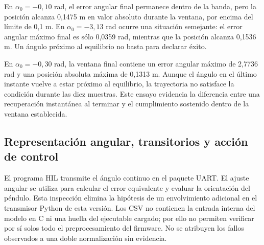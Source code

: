 
En $\alpha_0=-0{,}10$ rad, el error angular final permanece dentro de la banda, pero la posición alcanza 0,1475 m en valor absoluto durante la ventana, por encima del límite de 0,1 m. En $\alpha_0=-3{,}13$ rad ocurre una situación semejante: el error angular máximo final es sólo 0,0359 rad, mientras que la posición alcanza 0,1536 m. Un ángulo próximo al equilibrio no basta para declarar éxito.

En $\alpha_0=-0{,}30$ rad, la ventana final contiene un error angular máximo de 2,7736 rad y una posición absoluta máxima de 0,1313 m. Aunque el ángulo en el último instante vuelve a estar próximo al equilibrio, la trayectoria no satisface la condición durante las diez muestras. Este ensayo evidencia la diferencia entre una recuperación instantánea al terminar y el cumplimiento sostenido dentro de la ventana establecida.

\FloatBarrier
\subsection{Representación angular, transitorios y acción de control}
El programa HIL transmite el ángulo continuo en el paquete UART. El ajuste angular se utiliza para calcular el error equivalente y evaluar la orientación del péndulo. Esta inspección elimina la hipótesis de un envolvimiento adicional en el transmisor Python de esta versión. Los CSV no contienen la entrada interna del modelo en C ni una huella del ejecutable cargado; por ello no permiten verificar por sí solos todo el preprocesamiento del firmware. No se atribuyen los fallos observados a una doble normalización sin evidencia.


